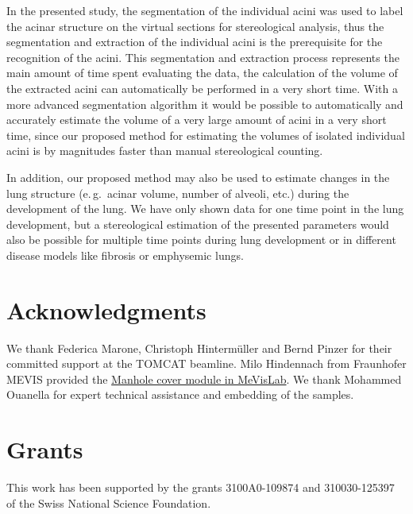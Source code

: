 \documentclass[final,paper=a4,DIV=calc,abstract,english]{scrartcl}
\newcommand{\eg}{e.\,g.\ }
\begin{document}
In the presented study, the segmentation of the individual acini was used to label the acinar structure on the virtual sections for stereological analysis, thus the segmentation and extraction of the individual acini is the prerequisite for the recognition of the acini.
This segmentation and extraction process represents the main amount of time spent evaluating the data, the calculation of the volume of the extracted acini can automatically be performed in a very short time.
With a more advanced segmentation algorithm it would be possible to automatically and accurately estimate the volume of a very large amount of acini in a very short time, since our proposed method for estimating the volumes of isolated individual acini is by magnitudes faster than manual stereological counting.

In addition, our proposed method may also be used to estimate changes in the lung structure (\eg acinar volume, number of alveoli, etc.) during the development of the lung.
We have only shown data for one time point in the lung development, but a stereological estimation of the presented parameters would also be possible for multiple time points during lung development or in different disease models like fibrosis or emphysemic lungs.

\section{Acknowledgments}
We thank Federica Marone, Christoph Hintermüller and Bernd Pinzer for their committed support at the TOMCAT beamline.
Milo Hindennach from Fraunhofer MEVIS provided the \href{http://www.mevis-research.de/cgi-bin/discus/board-auth.cgi?lm=1282233250&file=/839/11760.html}{Manhole cover module in MeVisLab}.
We thank Mohammed Ouanella for expert technical assistance and embedding of the samples.

\section{Grants}
This work has been supported by the grants 3100A0-109874 and 310030-125397 of the Swiss National Science Foundation.
\end{document}
